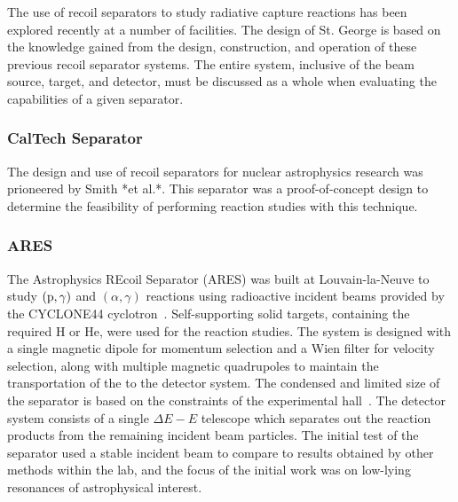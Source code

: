 The use of recoil separators to study radiative capture reactions has been
explored recently at a number of facilities. The design of St. George is based
on the knowledge gained from the design, construction, and operation of these
previous recoil separator systems. The entire system, inclusive of the beam
source, target, and detector, must be discussed as a whole when evaluating the
capabilities of a given separator.


\subsubsection{CalTech Separator}


The design and use of recoil separators for nuclear astrophysics research was
prioneered by Smith *et al.*. This separator was a proof-of-concept design to
determine the feasibility of performing reaction studies with this technique.


\subsubsection{ARES}

The Astrophysics REcoil Separator (ARES) was built at Louvain-la-Neuve to
study $(\rm{p},\gamma)$ and $(\alpha,\gamma)$ reactions using radioactive
incident beams provided by the CYCLONE44 cyclotron~\cite{Angulo2001}.
Self-supporting solid
targets, containing the required H or He, were used for the reaction
studies. The system is designed with a single magnetic dipole for momentum
selection and a Wien filter for velocity selection, along with multiple
magnetic quadrupoles to maintain the transportation of the to the detector
system. The condensed and limited size of the separator is based on the
constraints of the experimental hall~\cite{Couder2003}.
The detector system consists of a single
$\Delta E − E$ telescope which separates out the reaction products from the
remaining incident beam particles. The initial test of the separator used a
stable incident beam to compare to results obtained by other methods within
the lab, and the focus of the initial work was on low-lying resonances of
astrophysical interest.


